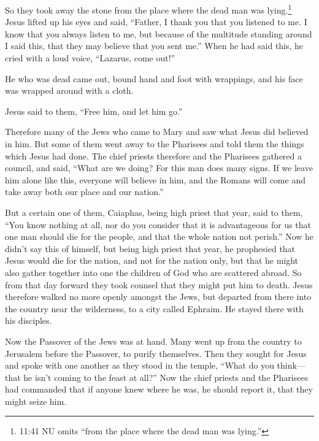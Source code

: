  So they took away the stone from the place where the dead
man was lying.\footnote{11:41 NU omits ``from the place where the dead
  man was lying.''} Jesus lifted up his eyes and said, ``Father, I thank
you that you listened to me.  I know that you always listen
to me, but because of the multitude standing around I said this, that
they may believe that you sent me.''  When he had said
this, he cried with a loud voice, ``Lazarus, come out!''

 He who was dead came out, bound hand and foot with
wrappings, and his face was wrapped around with a cloth.

Jesus said to them, ``Free him, and let him go.''

 Therefore many of the Jews who came to Mary and saw what
Jesus did believed in him.  But some of them went away to
the Pharisees and told them the things which Jesus had done.
 The chief priests therefore and the Pharisees gathered a
council, and said, ``What are we doing? For this man does many signs.
 If we leave him alone like this, everyone will believe in
him, and the Romans will come and take away both our place and our
nation.''

 But a certain one of them, Caiaphas, being high priest
that year, said to them, ``You know nothing at all,  nor do
you consider that it is advantageous for us that one man should die for
the people, and that the whole nation not perish.''  Now he
didn't say this of himself, but being high priest that year, he
prophesied that Jesus would die for the nation,  and not
for the nation only, but that he might also gather together into one the
children of God who are scattered abroad.  So from that day
forward they took counsel that they might put him to death.
 Jesus therefore walked no more openly amongst the Jews,
but departed from there into the country near the wilderness, to a city
called Ephraim. He stayed there with his disciples.

 Now the Passover of the Jews was at hand. Many went up
from the country to Jerusalem before the Passover, to purify themselves.
 Then they sought for Jesus and spoke with one another as
they stood in the temple, ``What do you think---that he isn't coming to
the feast at all?''  Now the chief priests and the
Pharisees had commanded that if anyone knew where he was, he should
report it, that they might seize him.


